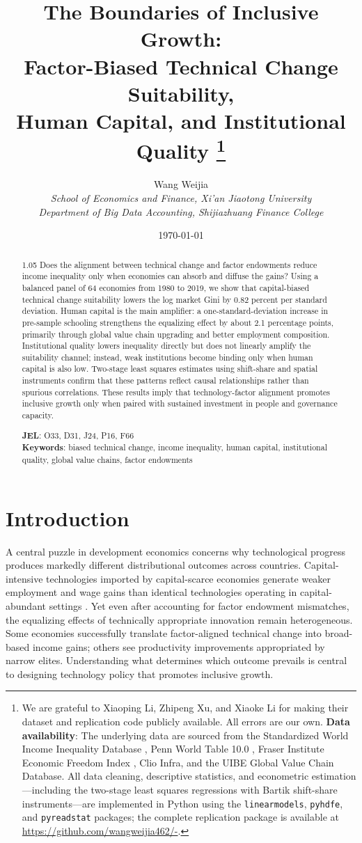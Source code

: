 \documentclass[12pt]{article}
\title{\textbf{The Boundaries of Inclusive Growth: \\
       Factor-Biased Technical Change Suitability, \\
       Human Capital, and Institutional Quality}%
       \thanks{We are grateful to Xiaoping Li, Zhipeng Xu, and Xiaoke Li
         for making their dataset and replication code publicly available.
         All errors are our own.
         \textbf{Data availability}: The underlying data are sourced from
         the Standardized World Income Inequality Database
         \citep{solt2016standardizing}, Penn World Table 10.0
         \citep{feenstra2015next}, Fraser Institute Economic Freedom Index
         \citep{gwartney2020economic}, Clio Infra, and the UIBE Global
         Value Chain Database. All data cleaning, descriptive statistics,
         and econometric estimation---including the two-stage least squares
         regressions with Bartik shift-share instruments---are implemented
         in Python using the \texttt{linearmodels}, \texttt{pyhdfe}, and
         \texttt{pyreadstat} packages; the complete replication package is
         available at \url{https://github.com/wangweijia462/-}.}}
\author{
  Wang Weijia \\
  \textit{School of Economics and Finance, Xi'an Jiaotong University} \\
  \textit{Department of Big Data Accounting, Shijiazhuang Finance College}
}
\date{\today}
\begin{document}
\maketitle

\begin{abstract}
\begin{spacing}{1.05}
\noindent
Does the alignment between technical change and factor endowments reduce
income inequality only when economies can absorb and diffuse the gains?
Using a balanced panel of 64 economies from 1980 to 2019, we show that
capital-biased technical change suitability lowers the log market Gini by
0.82 percent per standard deviation. Human capital is the main amplifier:
a one-standard-deviation increase in pre-sample schooling strengthens the
equalizing effect by about 2.1 percentage points, primarily through global
value chain upgrading and better employment composition. Institutional
quality lowers inequality directly but does not linearly amplify the
suitability channel; instead, weak institutions become binding only when
human capital is also low. Two-stage least squares estimates using
shift-share and spatial instruments confirm that these patterns reflect
causal relationships rather than spurious correlations. These results
imply that technology-factor alignment promotes inclusive growth only
when paired with sustained investment in people and governance capacity.

\bigskip
\noindent \textbf{JEL}: O33, D31, J24, P16, F66 \\
\noindent \textbf{Keywords}: biased technical change, income inequality,
human capital, institutional quality, global value chains, factor endowments
\end{spacing}
\end{abstract}

\clearpage

\section{Introduction}
\label{sec:intro}

A central puzzle in development economics concerns why technological
progress produces markedly different distributional outcomes across
countries. Capital-intensive technologies imported by capital-scarce
economies generate weaker employment and wage gains than identical
technologies operating in capital-abundant settings
\citep{acemoglu2001productivity, caselli2006technology}.
Yet even after accounting for factor endowment mismatches, the
equalizing effects of technically appropriate innovation remain
heterogeneous. Some economies successfully translate factor-aligned
technical change into broad-based income gains; others see productivity
improvements appropriated by narrow elites. Understanding what
determines which outcome prevails is central to designing technology
policy that promotes inclusive growth.
\end{document}
